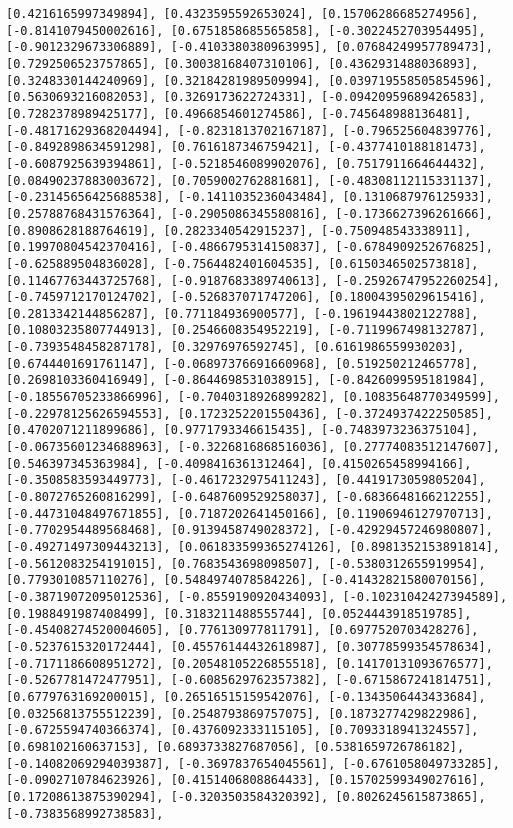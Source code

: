 \documentclass[11pt]{article}
\begin{document}
\begin{Verbatim}[commandchars=\\\{\}]
[0.4216165997349894], [0.4323595592653024], [0.15706286685274956], [-0.8141079450002616], [0.6751858685565858], [-0.3022452703954495], [-0.9012329673306889], [-0.4103380380963995], [0.07684249957789473], [0.7292506523757865], [0.30038168407310106], [0.4362931488036893], [0.3248330144240969], [0.32184281989509994], [0.039719558505854596], [0.5630693216082053], [0.3269173622724331], [-0.09420959689426583], [0.7282378989425177], [0.4966854601274586], [-0.745648988136481], [-0.48171629368204494], [-0.8231813702167187], [-0.796525604839776], [-0.8492898634591298], [0.7616187346759421], [-0.4377410188181473], [-0.6087925639394861], [-0.5218546089902076], [0.7517911664644432], [0.08490237883003672], [0.7059002762881681], [-0.48308112115331137], [-0.23145656425688538], [-0.1411035236043484], [0.1310687976125933], [0.25788768431576364], [-0.2905086345580816], [-0.1736627396261666], [0.8908628188764619], [0.2823340542915237], [-0.750948543338911], [0.19970804542370416], [-0.4866795314150837], [-0.6784909252676825], [-0.625889504836028], [-0.7564482401604535], [0.6150346502573818], [0.11467763443725768], [-0.9187683389740613], [-0.25926747952260254], [-0.7459712170124702], [-0.526837071747206], [0.18004395029615416], [0.2813342144856287], [0.771184936900577], [-0.19619443802122788], [0.10803235807744913], [0.2546608354952219], [-0.7119967498132787], [-0.7393548458287178], [0.32976976592745], [0.6161986559930203], [0.6744401691761147], [-0.06897376691660968], [0.519250212465778], [0.2698103360416949], [-0.8644698531038915], [-0.8426099595181984], [-0.18556705233866996], [-0.7040318926899282], [0.10835648770349599], [-0.22978125626594553], [0.1723252201550436], [-0.3724937422250585], [0.4702071211899686], [0.9771793346615435], [-0.7483973236375104], [-0.06735601234688963], [-0.3226816868516036], [0.27774083512147607], [0.546397345363984], [-0.4098416361312464], [0.4150265458994166], [-0.3508583593449773], [-0.4617232975411243], [0.4419173059805204], [-0.8072765260816299], [-0.6487609529258037], [-0.6836648166212255], [-0.44731048497671855], [0.7187202641450166], [0.11906946127970713], [-0.7702954489568468], [0.9139458749028372], [-0.42929457246980807], [-0.49271497309443213], [0.061833599365274126], [0.8981352153891814], [-0.5612083254191015], [0.7683543698098507], [-0.5380312655919954], [0.7793010857110276], [0.5484974078584226], [-0.41432821580070156], [-0.38719072095012536], [-0.8559190920434093], [-0.10231042427394589], [0.1988491987408499], [0.3183211488555744], [0.0524443918519785], [-0.45408274520004605], [0.776130977811791], [0.6977520703428276], [-0.5237615320172444], [0.45576144432618987], [0.30778599354578634], [-0.7171186608951272], [0.20548105226855518], [0.14170131093676577], [-0.5267781472477951], [-0.6085629762357382], [-0.6715867241814751], [0.6779763169200015], [0.26516515159542076], [-0.1343506443433684], [0.03256813755512239], [0.2548793869757075], [0.1873277429822986], [-0.6725594740366374], [0.4376092333115105], [0.7093318941324557], [0.698102160637153], [0.6893733827687056], [0.5381659726786182], [-0.14082069294039387], [-0.3697837654045561], [-0.6761058049733285], [-0.0902710784623926], [0.4151406808864433], [0.15702599349027616], [0.17208613875390294], [-0.3203503584320392], [0.8026245615873865], [-0.7383568992738583], 
\end{Verbatim}
\end{document}
